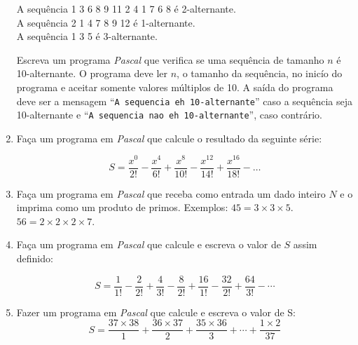 \begin{enumerate}
\noindent
A sequência 1 3 6 8 9 11 2 4 1 7 6 8 é 2-alternante. \\
A sequência 2 1 4 7 8 9 12 é 1-alternante.  \\
A sequência 1 3 5 é 3-alternante.

Escreva um programa \emph{Pascal} que verifica se uma sequência de tamanho $n$ é
10-alternante.  O programa deve ler $n$, o tamanho da sequência, no inicío do
programa e aceitar somente valores  múltiplos de 10.
A saída do programa deve ser a mensagem  ``{\tt A sequencia eh
10-alternante}'' caso a sequência seja 10-alternante e ``{\tt A sequencia
nao eh 10-alternante}'', caso contrário.


\item Faça um  programa em \emph{Pascal} que calcule
 o resultado da seguinte série:

\[
S = \frac{x^0}{2!} - \frac{x^4}{6!} + \frac{x^8}{10!} - \frac{x^{12}}{14!} + \frac{x^{16}}{18!} - \ldots
\]


\item Faça um programa em \emph{Pascal} que
receba como entrada um dado
inteiro $N$ e o imprima como um produto de primos. Exemplos:
$45 = 3 \times 3 \times 5$. $56 = 2 \times 2 \times 2 \times 7$.

\item Faça um programa em \emph{Pascal} que calcule e escreva o
 valor de $S$ assim definido:

 \[ 
        S = \frac {1}{1!} - \frac {2}{2!} + \frac {4}{3!}  - \frac
        {8}{2!} + \frac {16}{1!} - \frac {32}{2!} + \frac {64}{3!} -
        \cdots 
 \]

\item Fazer  um  programa em  \emph{Pascal}  que calcule e escreva o valor de S:
\[
    S = \frac {37 \times 38}{1} + \frac {36 \times 37}{2} + \frac {35 \times 36}{3} + 
        \cdots + \frac{1 \times 2}{37}
\]


\end{enumerate}
